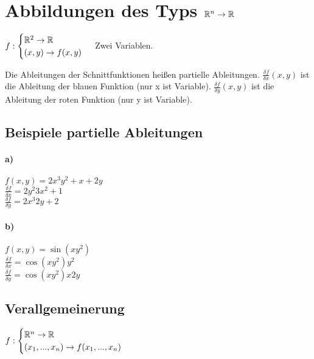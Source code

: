 \renewcommand{\ldate}{2015-10-01}	%

\section{Abbildungen des Typs $\mathbb{R}^n \rightarrow \mathbb{R}$}
$f: 
\begin{cases}
 \mathbb{R}^2 \rightarrow \mathbb{R}\\
 (x,y)\rightarrow f(x,y)
\end{cases}
$
Zwei Variablen.  


Die Ableitungen der Schnittfunktionen heißen partielle Ableitungen. $\frac{\delta f}{\delta x} (x,y)$ ist die Ableitung der blauen Funktion (nur x ist Variable). $\frac{\delta f}{\delta y} (x,y)$ ist die Ableitung der roten Funktion (nur y ist Variable).

\subsection{Beispiele partielle Ableitungen}

\paragraph{a)} $f(x,y)= 2x^3y^2 + x+2y $\\
$\frac{\delta f}{\delta x} = 2y^2 3x^2 + 1 $\\
$\frac{\delta f}{\delta y} = 2x^3 2y + 2 $

\paragraph{b)} $f(x,y) = \sin(x y^2)$\\
$\frac{\delta f}{\delta x} = \cos(x y^2) y^2$\\
$\frac{\delta f}{\delta y} = \cos(x y^2) x 2y$

\subsection{Verallgemeinerung}
$f: 
\begin{cases}
 \mathbb{R}^n \rightarrow \mathbb{R}\\
 (x_1, ..., x_n) \rightarrow f(x_1, ..., x_n)\\
\end{cases}
$\\

